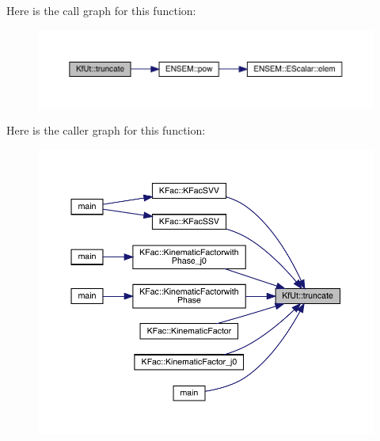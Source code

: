 Here is the call graph for this function\+:
\nopagebreak
\begin{figure}[H]
\begin{center}
\leavevmode
\includegraphics[width=350pt]{d8/da5/namespaceKfUt_a155e8db38d770e216ef19d9938394c17_cgraph}
\end{center}
\end{figure}
Here is the caller graph for this function\+:
\nopagebreak
\begin{figure}[H]
\begin{center}
\leavevmode
\includegraphics[width=350pt]{d8/da5/namespaceKfUt_a155e8db38d770e216ef19d9938394c17_icgraph}
\end{center}
\end{figure}
